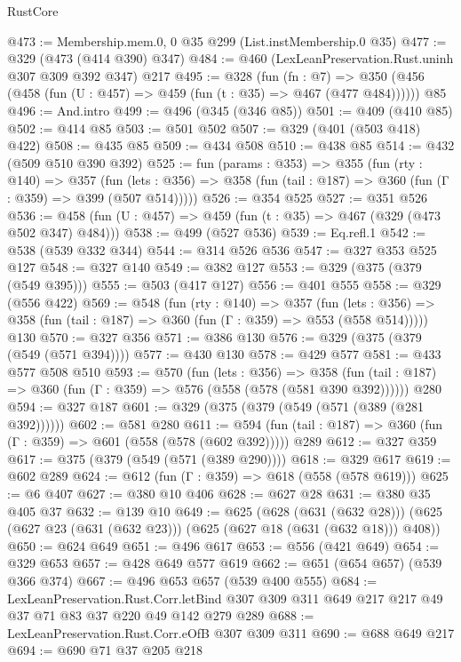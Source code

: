 \begin{lexlean}{RustCore}
\begin{coremodule}
@473 := Membership.mem.{0, 0} @35 @299 (List.instMembership.{0} @35)
@477 := @329 (@473 (@414 @390) @347)
@484 := @460 (LexLeanPreservation.Rust.uninh @307 @309 @392 @347) @217
@495 := @328
    (fun (fn : @7) =>
    @350 (@456 (@458 (fun (U : @457) => @459 (fun (t : @35) => @467 (@477 @484))))))
    @85
@496 := And.intro
@499 := @496 (@345 (@346 @85))
@501 := @409 (@410 @85)
@502 := @414 @85
@503 := @501 @502
@507 := @329 (@401 (@503 @418) @422)
@508 := @435 @85
@509 := @434 @508
@510 := @438 @85
@514 := @432 (@509 @510 @390 @392)
@525 := fun (params : @353) =>
  @355
    (fun (rty : @140) =>
    @357
      (fun (lets : @356) => @358 (fun (tail : @187) => @360 (fun (Γ : @359) => @399 (@507 @514)))))
@526 := @354 @525
@527 := @351 @526
@536 := @458 (fun (U : @457) => @459 (fun (t : @35) => @467 (@329 (@473 @502 @347) @484)))
@538 := @499 (@527 @536)
@539 := Eq.refl.{1}
@542 := @538 (@539 @332 @344)
@544 := @314 @526 @536
@547 := @327 @353 @525 @127
@548 := @327 @140
@549 := @382 @127
@553 := @329 (@375 (@379 (@549 @395)))
@555 := @503 (@417 @127)
@556 := @401 @555
@558 := @329 (@556 @422)
@569 := @548
    (fun (rty : @140) =>
    @357
      (fun (lets : @356) => @358 (fun (tail : @187) => @360 (fun (Γ : @359) => @553 (@558 @514)))))
    @130
@570 := @327 @356
@571 := @386 @130
@576 := @329 (@375 (@379 (@549 (@571 @394))))
@577 := @430 @130
@578 := @429 @577
@581 := @433 @577 @508 @510
@593 := @570
    (fun (lets : @356) =>
    @358 (fun (tail : @187) => @360 (fun (Γ : @359) => @576 (@558 (@578 (@581 @390 @392))))))
    @280
@594 := @327 @187
@601 := @329 (@375 (@379 (@549 (@571 (@389 (@281 @392))))))
@602 := @581 @280
@611 := @594 (fun (tail : @187) => @360 (fun (Γ : @359) => @601 (@558 (@578 (@602 @392))))) @289
@612 := @327 @359
@617 := @375 (@379 (@549 (@571 (@389 @290))))
@618 := @329 @617
@619 := @602 @289
@624 := @612 (fun (Γ : @359) => @618 (@558 (@578 @619)))
@625 := @6 @407
@627 := @380 @10 @406
@628 := @627 @28
@631 := @380 @35 @405 @37
@632 := @139 @10
@649 := @625
    (@628 (@631 (@632 @28)))
    (@625 (@627 @23 (@631 (@632 @23))) (@625 (@627 @18 (@631 (@632 @18))) @408))
@650 := @624 @649
@651 := @496 @617
@653 := @556 (@421 @649)
@654 := @329 @653
@657 := @428 @649 @577 @619
@662 := @651 (@654 @657) (@539 @366 @374)
@667 := @496 @653 @657 (@539 @400 @555)
@684 := LexLeanPreservation.Rust.Corr.letBind
    @307
    @309
    @311
    @649
    @217
    @217
    @49
    @37
    @71
    @83
    @37
    @220
    @49
    @142
    @279
    @289
@688 := LexLeanPreservation.Rust.Corr.eOfB @307 @309 @311
@690 := @688 @649 @217
@694 := @690 @71 @37 @205 @218

\end{coremodule}
\end{lexlean}
